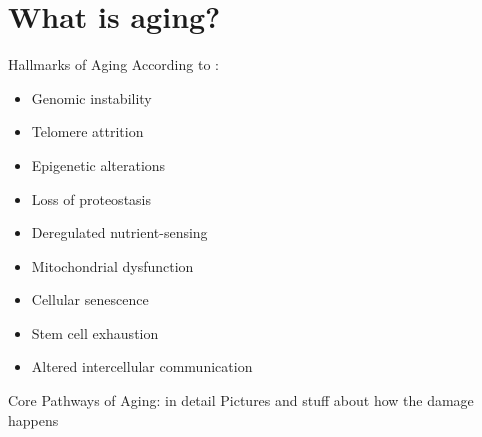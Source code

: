 \section{What is aging?}


\begin{frame}[c]{Hallmarks of Aging}
    According to \cite{lopez2013hallmarks}:
    \begin{itemize}[<+(1)->]
        \item Genomic instability
        \item Telomere attrition
        \item Epigenetic alterations
        \item Loss of proteostasis
        \item Deregulated nutrient-sensing
        \item Mitochondrial dysfunction
        \item Cellular senescence
        \item Stem cell exhaustion
        \item Altered intercellular communication
    \end{itemize}
\end{frame}


\begin{frame}[c]{Core Pathways of Aging: in detail}
    Pictures and stuff about how the damage happens
\end{frame}
